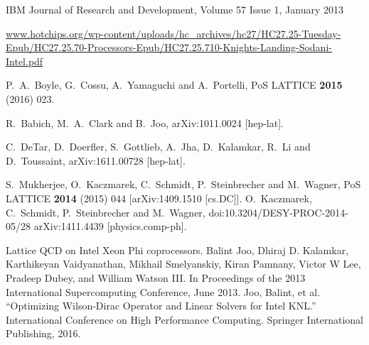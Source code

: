\documentclass{PoS}
\begin{document}
\begin{thebibliography}{99}
 IBM Journal of Research and Development, Volume 57 Issue 1, January 2013 

\href{http://www.hotchips.org/wp-content/uploads/hc_archives/hc27/HC27.25-Tuesday-Epub/HC27.25.70-Processors-Epub/HC27.25.710-Knights-Landing-Sodani-Intel.pdf}{www.hotchips.org/wp-content/uploads/hc\_archives/hc27/HC27.25-Tuesday-Epub/HC27.25.70-Processors-Epub/HC27.25.710-Knights-Landing-Sodani-Intel.pdf}

P.~A.~Boyle, G.~Cossu, A.~Yamaguchi and A.~Portelli,
  PoS LATTICE {\bf 2015} (2016) 023.

 R.~Babich, M.~A.~Clark and B.~Joo,
  arXiv:1011.0024 [hep-lat].

  C.~DeTar, D.~Doerfler, S.~Gottlieb, A.~Jha, D.~Kalamkar, R.~Li and D.~Toussaint,
  arXiv:1611.00728 [hep-lat].

 S.~Mukherjee, O.~Kaczmarek, C.~Schmidt, P.~Steinbrecher and M.~Wagner,
  PoS LATTICE {\bf 2014} (2015) 044
  [arXiv:1409.1510 [cs.DC]].
 O.~Kaczmarek, C.~Schmidt, P.~Steinbrecher and M.~Wagner,
  doi:10.3204/DESY-PROC-2014-05/28
  arXiv:1411.4439 [physics.comp-ph].

Lattice QCD on Intel Xeon Phi coprocessors. Balint Joo, Dhiraj D. Kalamkar, Karthikeyan Vaidyanathan, Mikhail Smelyanskiy, Kiran Pamnany, Victor W Lee, Pradeep Dubey, and William Watson III. In Proceedings of the 2013 International Supercomputing Conference, June 2013.
Joo, Balint, et al. ``Optimizing Wilson-Dirac Operator and Linear Solvers for Intel KNL.'' International Conference on High Performance Computing. Springer International Publishing, 2016.


\end{thebibliography}
\end{document}
